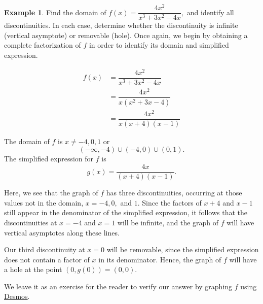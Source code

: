 \documentclass[12pt]{book}
\theoremstyle{definition}
\newtheorem{example}{Example}
\newcommand{\Desmos}{\href{https://www.desmos.com/}{Desmos}}
\begin{document}
\begin{example}
Find the domain of $f(x)=\dfrac{4x^2}{x^3+3x^2-4x},$ and identify all discontinuities.  In each case, determine whether the discontinuity is infinite (vertical asymptote) or removable (hole).
Once again, we begin by obtaining a complete factorization of $f$ in order to identify its domain and simplified expression.
\begin{center}
\begin{multicols}{2}
\begin{equation*}
\begin{split}
f(x) & =\dfrac{4x^2}{x^3+3x^2-4x}\\
& = \dfrac{4x^2}{x(x^2+3x-4)}\\
& = \dfrac{4x^2}{x(x+4)(x-1)}
\end{split}
\end{equation*}

\columnbreak

The domain of $f$ is $x\neq -4,0,1$ or
$$(-\infty,-4)\cup(-4,0)\cup(0,1).$$
The simplified expression for $f$ is
$$g(x)=\dfrac{4x}{(x+4)(x-1)}.$$
\end{multicols}
\end{center}
Here, we see that the graph of $f$ has three discontinuities, occurring at those values not in the domain, $x=-4,0,$ and $1$.  Since the factors of $x+4$ and $x-1$ still appear in the denominator of the simplified expression, it follows that the discontinuities at $x=-4$ and $x=1$ will be infinite, and the graph of $f$ will have vertical asymptotes along these lines.
\par
Our third discontinuity at $x=0$ will be removable, since the simplified expression does not contain a factor of $x$ in its denominator.  Hence, the graph of $f$ will have a hole at the point $(0,g(0))=(0,0)$.
\par
We leave it as an exercise for the reader to verify our answer by graphing $f$ using \Desmos.
\end{example}
\end{document}
